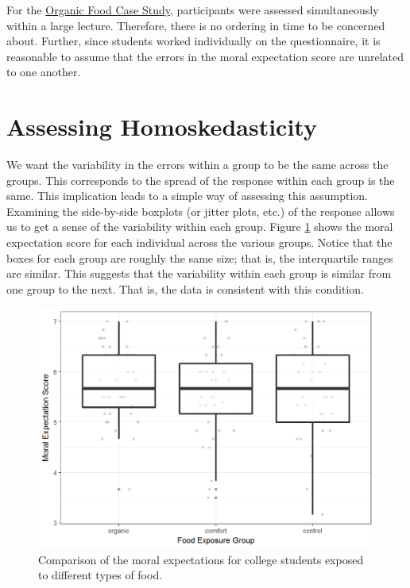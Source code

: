 \documentclass[]{book}
\theoremstyle{definition}
\theoremstyle{definition}
\theoremstyle{remark}
\begin{document}
For the \protect\hyperlink{CaseOrganic}{Organic Food Case Study},
participants were assessed simultaneously within a large lecture.
Therefore, there is no ordering in time to be concerned about. Further,
since students worked individually on the questionnaire, it is
reasonable to assume that the errors in the moral expectation score are
unrelated to one another.

\section{Assessing Homoskedasticity}\label{assessing-homoskedasticity}

We want the variability in the errors within a group to be the same
across the groups. This corresponds to the spread of the response within
each group is the same. This implication leads to a simple way of
assessing this assumption. Examining the side-by-side boxplots (or
jitter plots, etc.) of the response allows us to get a sense of the
variability within each group. Figure
\ref{fig:anovaassessment-variance-organic} shows the moral expectation
score for each individual across the various groups. Notice that the
boxes for each group are roughly the same size; that is, the
interquartile ranges are similar. This suggests that the variability
within each group is similar from one group to the next. That is, the
data is consistent with this condition.

\begin{figure}

{\centering \includegraphics[width=0.8\linewidth]{./Images/anovaassessment-variance-organic-1} 

}

\caption{Comparison of the moral expectations for college students exposed to different types of food.}\label{fig:anovaassessment-variance-organic}
\end{figure}
\end{document}
